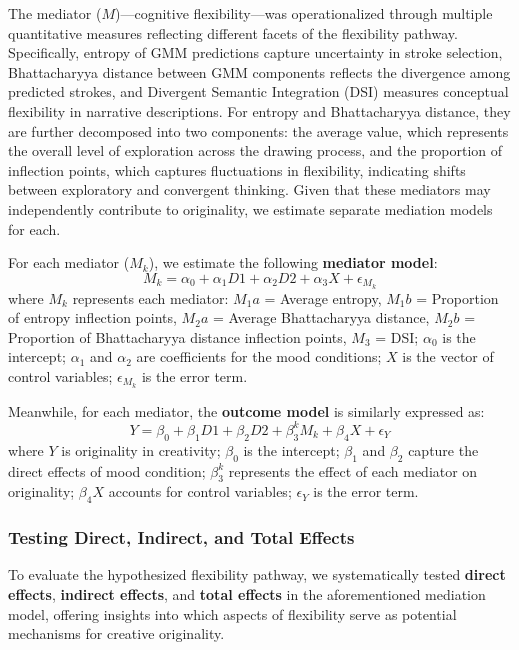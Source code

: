 \documentclass[../MA_Thesis.tex]{subfiles}
\begin{document}
The mediator (\(M\))—cognitive flexibility—was operationalized through multiple quantitative measures reflecting different facets of the flexibility pathway. Specifically, entropy of GMM predictions capture uncertainty in stroke selection, Bhattacharyya distance between GMM components reflects the divergence among predicted strokes, and Divergent Semantic Integration (DSI) measures conceptual flexibility in narrative descriptions. For entropy and Bhattacharyya distance, they are further decomposed into two components: the average value, which represents the overall level of exploration across the drawing process, and the proportion of inflection points, which captures fluctuations in flexibility, indicating shifts between exploratory and convergent thinking. Given that these mediators may independently contribute to originality, we estimate separate mediation models for each.

For each mediator (\(M_k\)), we estimate the following \textbf{mediator model}:
\begin{equation*}
    M_k = \alpha_0 + \alpha_1 D1 + \alpha_2 D2 + \alpha_3 X + \epsilon_{M_k}
\end{equation*}
where \( M_k \) represents each mediator: \( M_1a \) = Average entropy, \( M_1b \) = Proportion of entropy inflection points, \( M_2a \) = Average Bhattacharyya distance, \( M_2b \) = Proportion of Bhattacharyya distance inflection points, \( M_3 \) = DSI; \( \alpha_0 \) is the intercept; \( \alpha_1 \) and \( \alpha_2 \) are coefficients for the mood conditions; \( X \) is the vector of control variables; \( \epsilon_{M_k} \) is the error term.

Meanwhile, for each mediator, the \textbf{outcome model} is similarly expressed as:
\begin{equation*}
    Y = \beta_0 + \beta_1 D1 + \beta_2 D2 + \beta_3^k M_k + \beta_4 X + \epsilon_Y
\end{equation*}
where \( Y \) is originality in creativity; \( \beta_0 \) is the intercept; \( \beta_1 \) and \( \beta_2 \) capture the direct effects of mood condition; \( \beta_3^k \) represents the effect of each mediator on originality; \( \beta_4 X \) accounts for control variables; \( \epsilon_Y \) is the error term.

\subsubsection*{Testing Direct, Indirect, and Total Effects}
To evaluate the hypothesized flexibility pathway, we systematically tested \textbf{direct effects}, \textbf{indirect effects}, and \textbf{total effects} in the aforementioned mediation model, offering insights into which aspects of flexibility serve as potential mechanisms for creative originality.
\end{document}
